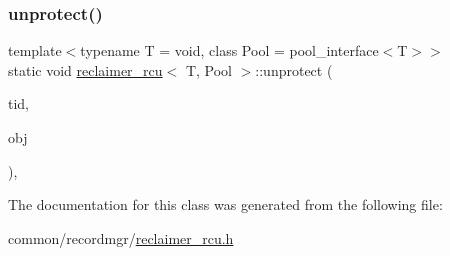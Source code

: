 \mbox{\label{classreclaimer__rcu_aa786ea177bb54fcfd771b25b1b2ced9e}} 
\subsubsection{\texorpdfstring{unprotect()}{unprotect()}}
{\footnotesize\ttfamily template$<$typename T  = void, class Pool  = pool\+\_\+interface$<$\+T$>$$>$ \\
static void \hyperlink{classreclaimer__rcu}{reclaimer\+\_\+rcu}$<$ T, Pool $>$\+::unprotect (\begin{DoxyParamCaption}\item[{const int}]{tid,  }\item[{T $\ast$const}]{obj }\end{DoxyParamCaption})\hspace{0.3cm}{\ttfamily [inline]}, {\ttfamily [static]}}



The documentation for this class was generated from the following file\+:\begin{DoxyCompactItemize}
\item 
common/recordmgr/\hyperlink{reclaimer__rcu_8h}{reclaimer\+\_\+rcu.\+h}\end{DoxyCompactItemize}
